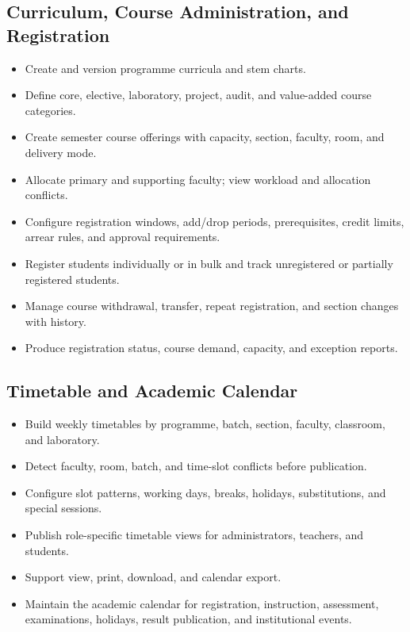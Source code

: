 \documentclass[10pt,a4paper]{article}
\begin{document}
\subsection{Curriculum, Course Administration, and Registration}
\begin{itemize}
  \item Create and version programme curricula and stem charts.
  \item Define core, elective, laboratory, project, audit, and value-added course categories.
  \item Create semester course offerings with capacity, section, faculty, room, and delivery mode.
  \item Allocate primary and supporting faculty; view workload and allocation conflicts.
  \item Configure registration windows, add/drop periods, prerequisites, credit limits,
        arrear rules, and approval requirements.
  \item Register students individually or in bulk and track unregistered or partially registered students.
  \item Manage course withdrawal, transfer, repeat registration, and section changes with history.
  \item Produce registration status, course demand, capacity, and exception reports.
\end{itemize}

\subsection{Timetable and Academic Calendar}
\begin{itemize}
  \item Build weekly timetables by programme, batch, section, faculty, classroom, and laboratory.
  \item Detect faculty, room, batch, and time-slot conflicts before publication.
  \item Configure slot patterns, working days, breaks, holidays, substitutions, and special sessions.
  \item Publish role-specific timetable views for administrators, teachers, and students.
  \item Support view, print, download, and calendar export.
  \item Maintain the academic calendar for registration, instruction, assessment,
        examinations, holidays, result publication, and institutional events.
\end{itemize}
\end{document}
